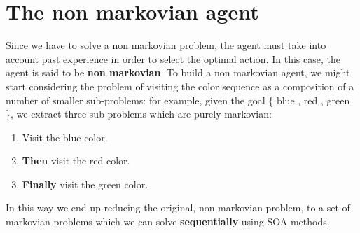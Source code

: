\documentclass{article}
\begin{document}


\section{The non markovian agent}
Since we have to solve a non markovian problem, the agent must take into account past experience in order to select the optimal action. In this case, the agent is said to be \textbf{non markovian}.
To build a non markovian agent, we might start considering the problem of visiting the color sequence as a composition of a number of smaller sub-problems: for example, given the goal \{\color{blue} blue \color{black}, \color{red} red \color{black}, \color{green} green \color{black} \}, we extract three sub-problems which are purely markovian:
\begin{enumerate}
    \item Visit the \color{blue} blue \color{black} color.
    \item \textbf{Then} visit the \color{red} red \color{black} color.
    \item \textbf{Finally} visit the \color{green} green \color{black} color.
\end{enumerate}
In this way we end up reducing the original, non markovian problem, to a set of markovian problems which we can solve \textbf{sequentially} using SOA methods.\\
\end{document}
